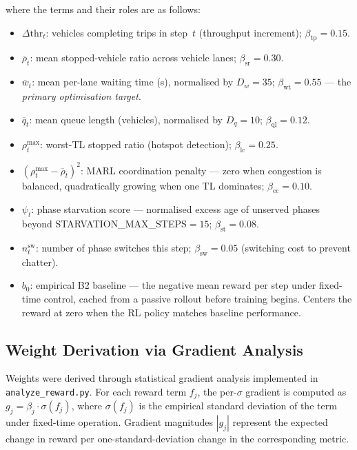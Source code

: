 \documentclass[12pt,oneside,a4paper]{report}
\begin{document}
\noindent where the terms and their roles are as follows:

\begin{itemize}[leftmargin=*]
  \item $\Delta\text{thr}_t$: vehicles completing trips in step~$t$
        (throughput increment); $\beta_\text{tp}=0.15$.

  \item $\overline{\rho}_t$: mean stopped-vehicle ratio across
        vehicle lanes; $\beta_\text{sr}=0.30$.

  \item $\overline{w}_t$: mean per-lane waiting time (s), normalised
        by $D_w=35$; $\beta_\text{wt}=0.55$ --- the \emph{primary
        optimisation target}.

  \item $\overline{q}_t$: mean queue length (vehicles), normalised
        by $D_q=10$; $\beta_\text{ql}=0.12$.

  \item $\rho^\text{max}_t$: worst-TL stopped ratio (hotspot
        detection); $\beta_\text{lc}=0.25$.

  \item $(\rho^\text{max}_t-\overline{\rho}_t)^2$: MARL coordination
        penalty --- zero when congestion is balanced, quadratically
        growing when one TL dominates; $\beta_\text{cc}=0.10$.

  \item $\psi_t$: phase starvation score --- normalised excess age
        of unserved phases beyond \textsc{STARVATION\_MAX\_STEPS}$=15$;
        $\beta_\text{st}=0.08$.

  \item $n^\text{sw}_t$: number of phase switches this step;
        $\beta_\text{sw}=0.05$ (switching cost to prevent chatter).

  \item $b_0$: empirical B2 baseline --- the negative mean reward
        per step under fixed-time control, cached from a passive
        rollout before training begins.  Centers the reward at zero
        when the RL policy matches baseline performance.
\end{itemize}

\subsection{Weight Derivation via Gradient Analysis}

Weights were derived through statistical gradient analysis
implemented in \texttt{analyze\_reward.py}.  For each reward term
$f_j$, the per-$\sigma$ gradient is computed as
$g_j = \beta_j \cdot \sigma(f_j)$, where $\sigma(f_j)$ is the
empirical standard deviation of the term under fixed-time operation.
Gradient magnitudes $|g_j|$ represent the expected change in reward
per one-standard-deviation change in the corresponding metric.
\end{document}
